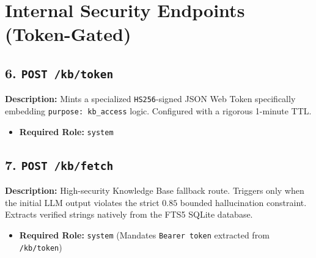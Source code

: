 \documentclass[11pt,a4paper]{article}
\begin{document}
\section{Internal Security Endpoints (Token-Gated)}

\subsection{6. \texttt{POST /kb/token}}
\textbf{Description:} Mints a specialized \texttt{HS256}-signed JSON Web Token specifically embedding \texttt{purpose: kb\_access} logic. Configured with a rigorous 1-minute TTL.
\begin{itemize}
    \item \textbf{Required Role:} \texttt{system}
\end{itemize}

\subsection{7. \texttt{POST /kb/fetch}}
\textbf{Description:} High-security Knowledge Base fallback route. Triggers only when the initial LLM output violates the strict $0.85$ bounded hallucination constraint. Extracts verified strings natively from the FTS5 SQLite database.
\begin{itemize}
    \item \textbf{Required Role:} \texttt{system} (Mandates \texttt{Bearer token} extracted from \texttt{/kb/token})
\end{itemize}
\end{document}
